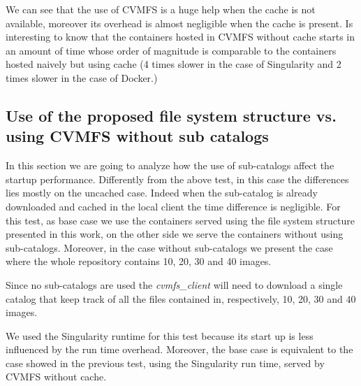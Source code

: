 

We can see that the use of CVMFS is a huge help when the cache is not
available, moreover its overhead is almost negligible when the cache is
present. Is interesting to know that the containers hosted in CVMFS without
cache starts in an amount of time whose order of magnitude is comparable to the
containers hosted naively but using cache (4 times slower in the case of
Singularity and 2 times slower in the case of Docker.)

\subsection{Use of the proposed file system structure vs. using CVMFS without sub catalogs}

In this section we are going to analyze how the use of sub-catalogs affect the
startup performance. Differently from the above test, in this case the
differences lies mostly on the uncached case. Indeed when the sub-catalog is
already downloaded and cached in the local client the time difference is
negligible. For this test, as base case we use the containers served using the file
system structure presented in this work, on the other side we serve the
containers without using sub-catalogs. Moreover, in the case without
sub-catalogs we present the case where the whole repository contains 10,
20, 30 and 40 images.

Since no sub-catalogs are used the \textit{cvmfs\_client} will need to download
a single catalog that keep track of all the files contained in, respectively,
10, 20, 30 and 40 images.

We used the Singularity runtime for this test because its start up is less
influenced by the run time overhead. Moreover, the base case is equivalent to
the case showed in the previous test, using the Singularity run time, served by
CVMFS without cache. 


